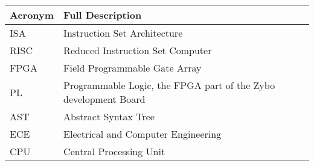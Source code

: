 \begin{table}[H]
	\begin{tabularx}{\textwidth}{| a | x |}
		\hline
		\textbf{Acronym} & \textbf{Full Description}                                       \\
		\hline
		ISA              & Instruction Set Architecture                                    \\
		RISC             & Reduced Instruction Set Computer                                \\
		FPGA             & Field Programmable Gate Array                                   \\
		PL               & Programmable Logic, the FPGA part of the Zybo development Board \\
		AST				 & Abstract Syntax Tree                                            \\
		ECE              & Electrical and Computer Engineering                             \\
		CPU              & Central Processing Unit                                         \\
		\hline
	\end{tabularx}
\end{table}

